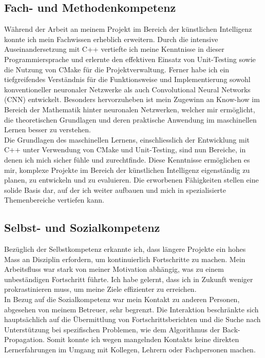 \subsection{Fach- und Methodenkompetenz}
Während der Arbeit an meinem Projekt im Bereich der künstlichen Intelligenz konnte ich mein Fachwissen erheblich erweitern. Durch die intensive Auseinandersetzung mit C++ vertiefte ich meine Kenntnisse in dieser Programmiersprache und erlernte den effektiven Einsatz von Unit-Testing sowie die Nutzung von CMake für die Projektverwaltung. Ferner habe ich ein tiefgreifendes Verständnis für die Funktionsweise und Implementierung sowohl konventioneller neuronaler Netzwerke als auch Convolutional Neural Networks (CNN) entwickelt. Besonders hervorzuheben ist mein Zugewinn an Know-how im Bereich der Mathematik hinter neuronalen Netzwerken, welcher mir ermöglicht, die theoretischen Grundlagen und deren praktische Anwendung im maschinellen Lernen besser zu verstehen.
\\
Die Grundlagen des maschinellen Lernens, einschliesslich der Entwicklung mit C++ unter Verwendung von CMake und Unit-Testing, sind nun Bereiche, in denen ich mich sicher fühle und zurechtfinde. Diese Kenntnisse ermöglichen es mir, komplexe Projekte im Bereich der künstlichen Intelligenz eigenständig zu planen, zu entwickeln und zu evaluieren. Die erworbenen Fähigkeiten stellen eine solide Basis dar, auf der ich weiter aufbauen und mich in spezialisierte Themenbereiche vertiefen kann.

\subsection{Selbst- und Sozialkompetenz}
Bezüglich der Selbstkompetenz erkannte ich, dass längere Projekte ein hohes Mass an Disziplin erfordern, um kontinuierlich Fortschritte zu machen. Mein Arbeitsfluss war stark von meiner Motivation abhängig, was zu einem unbeständigen Fortschritt führte. Ich habe gelernt, dass ich in Zukunft weniger prokrastinieren muss, um meine Ziele effizienter zu erreichen.
\\
In Bezug auf die Sozialkompetenz war mein Kontakt zu anderen Personen, abgesehen von meinem Betreuer, sehr begrenzt. Die Interaktion beschränkte sich hauptsächlich auf die Übermittlung von Fortschrittsberichten und die Suche nach Unterstützung bei spezifischen Problemen, wie dem Algorithmus der Back-Propagation. Somit konnte ich wegen mangelnden Kontakts keine direkten Lernerfahrungen im Umgang mit Kollegen, Lehrern oder Fachpersonen machen. 

